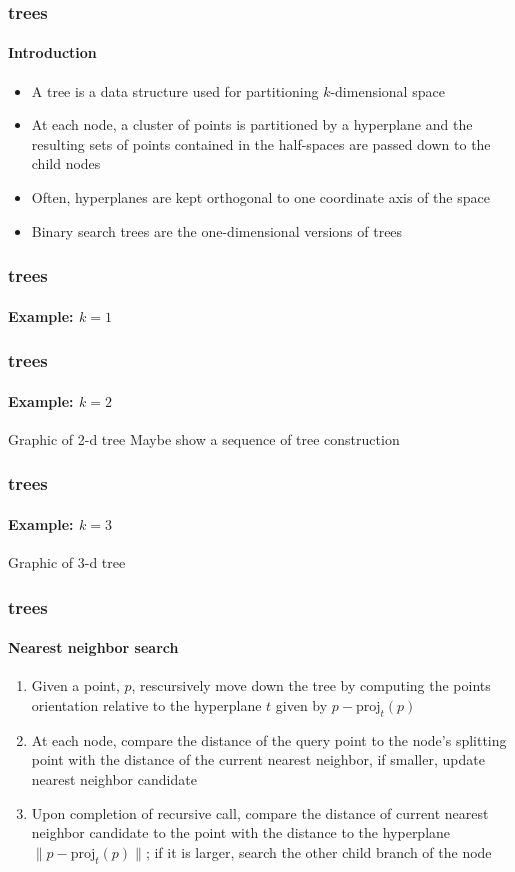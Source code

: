 

\begin{frame}
  \frametitle{\kd trees}
  \framesubtitle{Introduction}

  \begin{itemize}
    \item A \kd tree is a data structure used for partitioning $k$-dimensional space
    \item At each node, a cluster of points is partitioned by a hyperplane and the resulting
      sets of points contained in the half-spaces are passed down to the child nodes
    \item Often, hyperplanes are kept orthogonal to one coordinate axis of the space
    \item Binary search trees are the one-dimensional versions of \kd trees
  \end{itemize}

\end{frame}

\begin{frame}
  \frametitle{\kd trees}
  \framesubtitle{Example: $k=1$}

  \begin{figure}
    \centering
  \end{figure}
  
\end{frame}

\begin{frame}
  \frametitle{\kd trees}
  \framesubtitle{Example: $k=2$}
  
  Graphic of 2-d tree
  Maybe show a sequence of tree construction 
  
\end{frame}

\begin{frame}
  \frametitle{\kd trees}
  \framesubtitle{Example: $k=3$}
  
  Graphic of 3-d tree
  
\end{frame}

\begin{frame}
  \frametitle{\kd trees}
  \framesubtitle{Nearest neighbor search}

  \begin{enumerate}
    \item Given a point, $p$, rescursively move down the tree by computing the points orientation relative to the 
      hyperplane $t$ given by $p - \text{proj}_t(p)$
    \item At each node, compare the distance of the query point to the node's splitting point with the distance
      of the current nearest neighbor, if smaller, update nearest neighbor candidate
    \item Upon completion of recursive call, compare the distance of current nearest neighbor 
      candidate to the point with the distance to the hyperplane $\|p - \text{proj}_t(p)\|$; 
      if it is larger, search the other child branch of the node
  \end{enumerate}

\end{frame}

